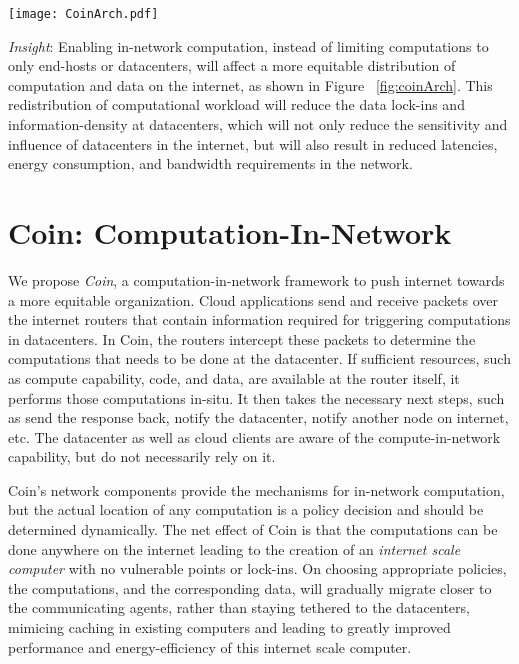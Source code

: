 \documentclass[twocolumn]{article}
\begin{document}
\begin{figure*}
\texttt{[image: CoinArch.pdf]}
\vspace*{-5mm}
\caption{Coin (Computation In Network) framework can lead to a more equitable
    distribution of data and computation over internet saving it from the
    dominance of datacenters.}
\label{fig:coinArch}
\vspace*{-2mm}
\end{figure*}

\textit{Insight}: Enabling in-network computation, instead of limiting computations
to only end-hosts or datacenters, will affect a more equitable distribution of
computation and data on the internet, as shown in Figure ~\ref{fig:coinArch}.
This redistribution of computational workload will reduce the data lock-ins and
information-density at datacenters, which will not only reduce the sensitivity
and influence of datacenters in the internet, but will also result in reduced
latencies, energy consumption, and bandwidth requirements in the network.

\vspace*{-3mm}
\section*{Coin: Computation-In-Network}
We propose \textit{Coin}, a computation-in-network framework to push internet
towards a more equitable organization. Cloud applications send and receive
packets over the internet routers that contain information required for triggering
computations in datacenters. In Coin, the routers intercept these packets to
determine the computations that needs to be done at the datacenter. If sufficient
resources, such as compute capability, code, and data, are available at the router
itself, it performs those computations in-situ. It then takes the necessary next
steps, such as send the response back, notify the datacenter, notify another
node on internet, etc. The datacenter as well as cloud clients are aware of
the compute-in-network capability, but do not necessarily rely on it.

Coin's network components provide the mechanisms for in-network computation, but
the actual location of any computation is a policy decision and should be determined
dynamically. The net effect of Coin is that the computations can be done anywhere
on the internet leading to the creation of an \textit{internet scale computer} with
no vulnerable points or lock-ins. On choosing appropriate policies, the computations,
and the corresponding data, will gradually migrate closer to the communicating agents,
rather than staying tethered to the datacenters, mimicing caching in existing computers
and leading to greatly improved performance and energy-efficiency of this internet scale
computer.
\end{document}
